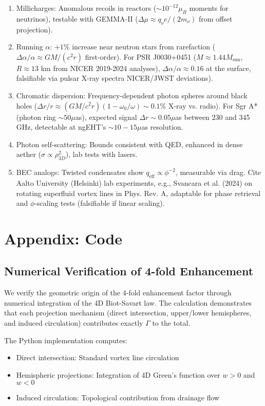 \documentclass{article}
\begin{document}
\begin{enumerate}
\item Millicharges: Anomalous recoils in reactors ($\sim 10^{-12} \mu_B$ moments for neutrinos), testable with GEMMA-II ($\Delta \mu \approx q_\nu e / (2 m_\nu)$ from offset projection).
\item Running $\alpha$: $+1\%$ increase near neutron stars from rarefaction ($\Delta \alpha / \alpha \approx G M / (c^2 r)$ first-order). For PSR J0030+0451 ($M \approx 1.44 M_{\text{sun}}$, $R \approx 13$ km from NICER 2019-2024 analyses), $\Delta \alpha / \alpha \approx 0.16$ at the surface, falsifiable via pulsar X-ray spectra NICER/JWST deviations).
\item Chromatic dispersion: Frequency-dependent photon spheres around black holes ($\Delta r / r \approx (G M / c^2 r) (1 - \omega_0 / \omega) \sim 0.1\%$ X-ray vs. radio). For Sgr A* (photon ring $\sim 50 \mu$as), expected signal $\Delta r \sim 0.05 \mu$as between 230 and 345 GHz, detectable at ngEHT's $\sim 10-15 \mu$as resolution.
\item Photon self-scattering: Bounds consistent with QED, enhanced in dense aether ($\sigma \propto \rho_{3D}^2$), lab tests with lasers.
\item BEC analogs: Twisted condensates show $q_{\text{eff}} \propto \phi^{-2}$, measurable via drag. Cite Aalto University (Helsinki) lab experiments, e.g., Svancara et al. (2024) on rotating superfluid vortex lines in Phys. Rev. A, adaptable for phase retrieval and $\phi$-scaling tests (falsifiable if linear scaling).
\end{enumerate}


\appendix

\section{Appendix: Code}

\subsection{Numerical Verification of 4-fold Enhancement}

We verify the geometric origin of the 4-fold enhancement factor through numerical integration of the 4D Biot-Savart law. The calculation demonstrates that each projection mechanism (direct intersection, upper/lower hemispheres, and induced circulation) contributes exactly $\Gamma$ to the total.

The Python implementation computes:
\begin{itemize}
\item Direct intersection: Standard vortex line circulation
\item Hemispheric projections: Integration of 4D Green's function over $w>0$ and $w<0$
\item Induced circulation: Topological contribution from drainage flow
\end{itemize}
\end{document}
